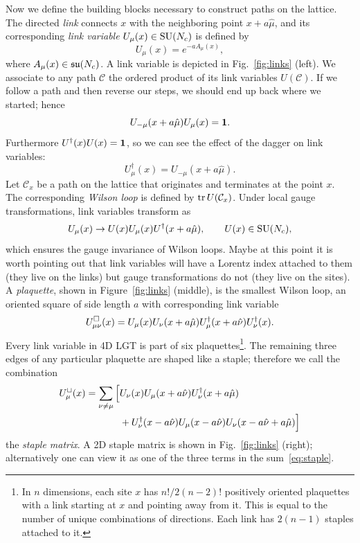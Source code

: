 Now we define the building blocks necessary to construct paths on the 
lattice. The directed {\it link} connects $x$ with the 
neighboring point $x+a\hat{\mu}$, and its corresponding {\it link variable} 
$U_\mu(x)\in \operatorname{SU}(N_c)$ is defined by
\begin{equation}\label{eq:linkVariable}
  U_\mu(x)=e^{-aA_{\mu}(x)},
\end{equation}
where $A_{\mu}(x)\in\operatorname{\mathfrak{su}}(N_c)$. A link variable is
depicted in Fig.~\ref{fig:links} (left).
We associate to any path $\mathcal{C}$ 
the ordered product of its link variables $U(\mathcal{C})$. 
If we follow a path and then reverse our steps, we should end
up back where we started; hence
\begin{equation}
  U_{-\mu}(x+a\hat{\mu})U_\mu(x)={\mathbf 1}.
\end{equation}
Furthermore $U^\dagger(x)U(x)={\mathbf 1}$, so we can see the effect
of the dagger on link variables:
\begin{equation}
  U_\mu^\dagger(x)=U_{-\mu}(x+a\hat{\mu}).
\end{equation}
Let $\mathcal{C}_{x}$ be a path on the lattice that originates and 
terminates at the point $x$. The corresponding {\it Wilson loop} is 
defined by $\tr U(\mathcal{C}_{x})$. 
Under local gauge transformations, link variables 
transform as
\begin{equation}
  U_\mu(x)\to U(x)U_\mu(x)U^{\dagger}(x+a\hat{\mu}),\qquad
  U(x)\in\operatorname{SU}(N_c),
\end{equation}
which ensures the gauge invariance of Wilson loops.
Maybe at this point it is worth pointing out that link variables will
have a Lorentz index attached to them (they live on the links) but
gauge transformations do not (they live on the sites). A 
{\it plaquette}, shown in Figure~\ref{fig:links} (middle), is the 
smallest Wilson loop, an oriented square of side length $a$ with 
corresponding link variable 
\begin{equation}
  U^\square_{\mu\nu}(x)=U_\mu(x)U_\nu(x+a\hat{\mu})
                        U^\dagger_\mu(x+a\hat{\nu})U^\dagger_\nu(x).
\end{equation}
Every link variable in 4D LGT is part of six plaquettes\footnote{In $n$
dimensions, each site $x$ has $n!/2(n-2)!$ positively oriented plaquettes 
with a link starting at $x$ and pointing away from it. This is equal to the
number of unique combinations of directions. Each link has $2(n-1)$ staples
attached to it.}. The remaining
three edges of any particular plaquette are shaped like
a staple; therefore we call the combination
\begin{equation}\begin{aligned}\label{eq:staple}\index{staple}
  U^\sqcup_\mu(x)=
  \sum_{\nu\ne\mu}\Big[
   &U_\nu(x)U_\mu(x+a\hat{\nu})U^\dagger_\nu(x+a\hat{\mu})\\
   &+U^\dagger_\nu(x-a\hat{\nu})U_\mu(x-a\hat{\nu})
                   U_\nu(x-a\hat{\nu}+a\hat{\mu})\Big]
\end{aligned}\end{equation}
the {\it staple matrix}. A 2D staple matrix is shown in
Fig.~\ref{fig:links} (right); alternatively one can view it
as one of the three terms in the sum~\eqref{eq:staple}.

